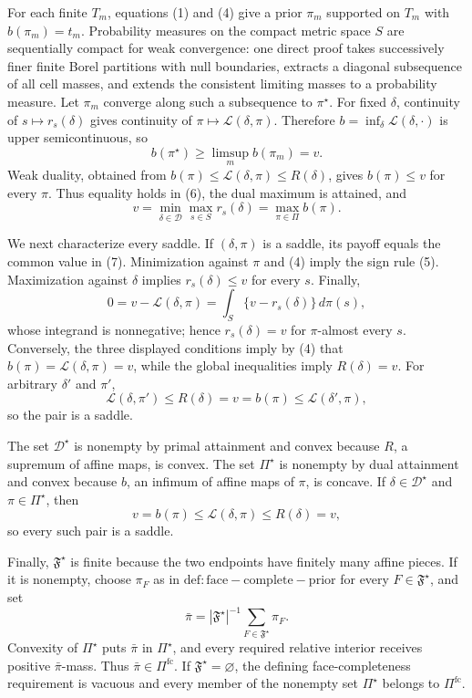 For each finite \(T_m\), equations (1) and (4) give a prior \(\pi_m\) supported on \(T_m\) with \(b(\pi_m)=t_m\). Probability measures on the compact metric space \(S\) are sequentially compact for weak convergence: one direct proof takes successively finer finite Borel partitions with null boundaries, extracts a diagonal subsequence of all cell masses, and extends the consistent limiting masses to a probability measure. Let \(\pi_m\) converge along such a subsequence to \(\pi^{\star}\). For fixed \(\delta\), continuity of \(s\mapsto r_s(\delta)\) gives continuity of \(\pi\mapsto\mathcal L(\delta,\pi)\). Therefore \(b=\inf_{\delta}\mathcal L(\delta,\cdot)\) is upper semicontinuous, so
\[
 b(\pi^{\star})\geq\limsup_m b(\pi_m)=v. \tag{6}
\]
Weak duality, obtained from \(b(\pi)\leq\mathcal L(\delta,\pi)\leq R(\delta)\), gives \(b(\pi)\leq v\) for every \(\pi\). Thus equality holds in (6), the dual maximum is attained, and
\[
 v=\min_{\delta\in\mathcal D}\max_{s\in S}r_s(\delta)
  =\max_{\pi\in\Pi}b(\pi). \tag{7}
\]

We next characterize every saddle. If \((\delta,\pi)\) is a saddle, its payoff equals the common value in (7). Minimization against \(\pi\) and (4) imply the sign rule (5). Maximization against \(\delta\) implies \(r_s(\delta)\leq v\) for every \(s\). Finally,
\[
 0=v-\mathcal L(\delta,\pi)=\int_S\{v-r_s(\delta)\}\,d\pi(s),
\]
whose integrand is nonnegative; hence \(r_s(\delta)=v\) for \(\pi\)-almost every \(s\). Conversely, the three displayed conditions imply by (4) that \(b(\pi)=\mathcal L(\delta,\pi)=v\), while the global inequalities imply \(R(\delta)=v\). For arbitrary \(\delta'\) and \(\pi'\),
\[
 \mathcal L(\delta,\pi')\leq R(\delta)=v
 =b(\pi)\leq\mathcal L(\delta',\pi),
\]
so the pair is a saddle.

The set \(\mathcal D^{\star}\) is nonempty by primal attainment and convex because \(R\), a supremum of affine maps, is convex. The set \(\Pi^{\star}\) is nonempty by dual attainment and convex because \(b\), an infimum of affine maps of \(\pi\), is concave. If \(\delta\in\mathcal D^{\star}\) and \(\pi\in\Pi^{\star}\), then
\[
 v=b(\pi)\leq\mathcal L(\delta,\pi)\leq R(\delta)=v,
\]
so every such pair is a saddle.

Finally, \(\mathfrak F^{\star}\) is finite because the two endpoints have finitely many affine pieces. If it is nonempty, choose \(\pi_F\) as in \(\mathrm{def:face-complete-prior}\) for every \(F\in\mathfrak F^{\star}\), and set
\[
 \bar\pi=|\mathfrak F^{\star}|^{-1}\sum_{F\in\mathfrak F^{\star}}\pi_F.
\]
Convexity of \(\Pi^{\star}\) puts \(\bar\pi\) in \(\Pi^{\star}\), and every required relative interior receives positive \(\bar\pi\)-mass. Thus \(\bar\pi\in\Pi^{\mathrm{fc}}\). If \(\mathfrak F^{\star}=\varnothing\), the defining face-completeness requirement is vacuous and every member of the nonempty set \(\Pi^{\star}\) belongs to \(\Pi^{\mathrm{fc}}\).

